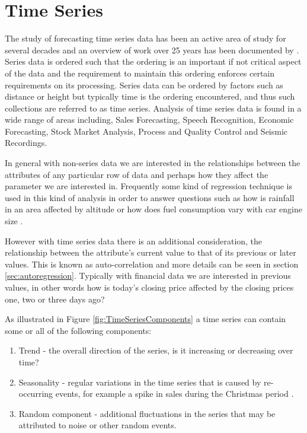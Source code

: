 \section{Time Series}
The study of forecasting time series data has been an active area of study for several decades and an overview of work over 25 years has been documented by \cite{DeGooijer2006443}. Series data is ordered such that the ordering is an important if not critical aspect of the data and the requirement to maintain this ordering enforces certain requirements on its processing. Series data can be ordered by factors such as distance or height but typically time is the ordering encountered, and thus such collections are referred to as time series. Analysis of time series data is found in a wide range of areas including, Sales Forecasting, Speech Recognition, Economic Forecasting, Stock Market Analysis, Process and Quality Control and Seismic Recordings.

In general with non-series data we are interested in the relationships between the attributes of any particular row of data and perhaps how they affect the parameter we are interested in. Frequently some kind of regression technique is used in this kind of analysis in order to answer questions such as how is rainfall in an area affected by altitude or how does fuel consumption vary with car engine size \citep{han2011data}.

However with time series data there is an additional consideration, the relationship between the attribute's current value to that of its previous or later values. This is known as auto-correlation \citep{mills2011} and more details can be seen in section \ref{sec:autoregression}. Typically with financial data we are interested in previous values, in other words how is today's closing price affected by the closing prices one, two or three days ago?

As illustrated in Figure \ref{fig:TimeSeriesComponents} a time series can contain some or all of the following components:
\begin{enumerate}
\item Trend - the overall direction of the series, is it increasing or decreasing over time?
\item Seasonality - regular variations in the time series that is caused by re-occurring events, for example a spike in sales during the Christmas period \citep{So2014212}.
\item Random component - additional fluctuations in the series that may be attributed to noise or other random events.
\end{enumerate}

